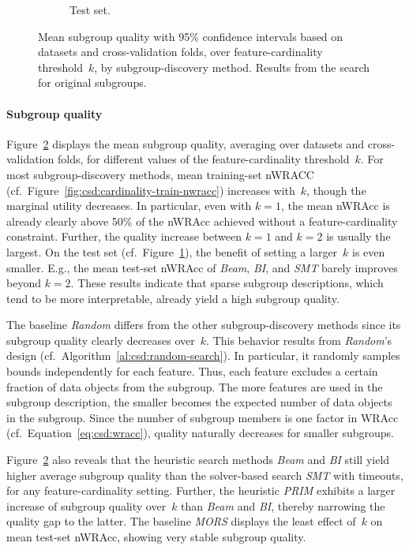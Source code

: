 \documentclass{article}
\theoremstyle{definition}
\begin{document}
\begin{figure}[t]
\begin{subfigure}[t]{0.48\textwidth}
		\caption{Test set.}
		\label{fig:csd:cardinality-test-nwracc}
	\end{subfigure}
	\caption{
		Mean subgroup quality with 95\% confidence intervals based on datasets and cross-validation folds, over feature-cardinality threshold~$k$, by subgroup-discovery method.
		Results from the search for original subgroups.
	}
	\label{fig:csd:cardinality-nwracc}
\end{figure}

\paragraph{Subgroup quality}

Figure~\ref{fig:csd:cardinality-nwracc} displays the mean subgroup quality, averaging over datasets and cross-validation folds, for different values of the feature-cardinality threshold~$k$.
For most subgroup-discovery methods, mean training-set nWRACC (cf.~Figure~\ref{fig:csd:cardinality-train-nwracc}) increases with~$k$, though the marginal utility decreases.
In particular, even with $k=1$, the mean nWRAcc is already clearly above 50\% of the nWRAcc achieved without a feature-cardinality constraint.
Further, the quality increase between $k=1$ and $k=2$ is usually the largest.
On the test set (cf.~Figure~\ref{fig:csd:cardinality-test-nwracc}), the benefit of setting a larger~$k$ is even smaller.
E.g., the mean test-set nWRAcc of \emph{Beam}, \emph{BI}, and \emph{SMT} barely improves beyond $k=2$.
These results indicate that sparse subgroup descriptions, which tend to be more interpretable, already yield a high subgroup quality.

The baseline \emph{Random} differs from the other subgroup-discovery methods since its subgroup quality clearly decreases over~$k$.
This behavior results from \emph{Random}'s design (cf.~Algorithm~\ref{al:csd:random-search}).
In particular, it randomly samples bounds independently for each feature.
Thus, each feature excludes a certain fraction of data objects from the subgroup.
The more features are used in the subgroup description, the smaller becomes the expected number of data objects in the subgroup.
Since the number of subgroup members is one factor in WRAcc (cf.~Equation~\ref{eq:csd:wracc}), quality naturally decreases for smaller subgroups.

Figure~\ref{fig:csd:cardinality-nwracc} also reveals that the heuristic search methods \emph{Beam} and \emph{BI} still yield higher average subgroup quality than the solver-based search \emph{SMT} with timeouts, for any feature-cardinality setting.
Further, the heuristic \emph{PRIM} exhibits a larger increase of subgroup quality over~$k$ than \emph{Beam} and \emph{BI}, thereby narrowing the quality gap to the latter.
The baseline \emph{MORS} displays the least effect of~$k$ on mean test-set nWRAcc, showing very stable subgroup quality.
\end{document}

